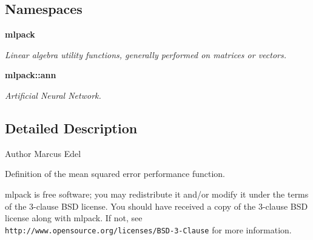 \subsection*{Namespaces}
\begin{DoxyCompactItemize}
\item 
 {\bf mlpack}
\begin{DoxyCompactList}\small\item\em Linear algebra utility functions, generally performed on matrices or vectors. \end{DoxyCompactList}\item 
 {\bf mlpack\+::ann}
\begin{DoxyCompactList}\small\item\em Artificial Neural Network. \end{DoxyCompactList}\end{DoxyCompactItemize}


\subsection{Detailed Description}
\begin{DoxyAuthor}{Author}
Marcus Edel
\end{DoxyAuthor}
Definition of the mean squared error performance function.

mlpack is free software; you may redistribute it and/or modify it under the terms of the 3-\/clause B\+SD license. You should have received a copy of the 3-\/clause B\+SD license along with mlpack. If not, see {\tt http\+://www.\+opensource.\+org/licenses/\+B\+S\+D-\/3-\/\+Clause} for more information. 